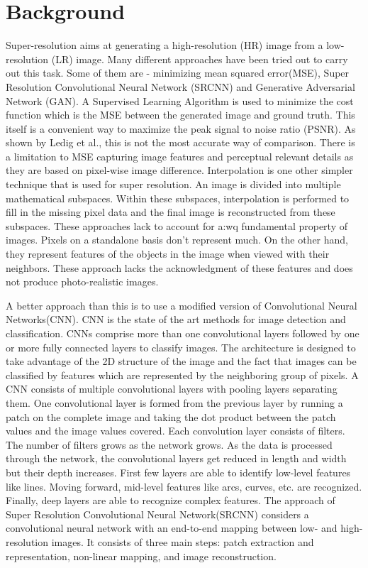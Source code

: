 \section{Background}

Super-resolution aims at generating a high-resolution (HR) image from a
low-resolution (LR) image. Many different approaches have been tried out to
carry out this task. Some of them are - minimizing mean squared error(MSE),
Super Resolution Convolutional Neural Network (SRCNN) and Generative Adversarial
Network (GAN). A Supervised Learning Algorithm is used to minimize the cost
function which is the MSE between the generated image and ground truth. This
itself is a convenient way to maximize the peak signal to noise ratio (PSNR).
As shown by Ledig et al.\cite{Ledig}, this is not the most accurate way of comparison.
There is a limitation to MSE capturing image features and perceptual relevant
details as they are based on pixel-wise image difference. Interpolation is one
other simpler technique that is used for super resolution\cite{Siu}. An image is
divided into multiple mathematical subspaces. Within these subspaces,
interpolation is performed to fill in the missing pixel data and the final image
is reconstructed from these subspaces. These approaches lack to account for a:wq
fundamental property of images. Pixels on a standalone basis don’t represent
much. On the other hand, they represent features of the objects in the image
when viewed with their neighbors. These approach lacks the acknowledgment of
these features and does not produce photo-realistic images\cite{Ferwerda}.

A better approach than this is to use a modified version of Convolutional Neural
Networks(CNN). CNN is the state of the art methods for image detection and
classification\cite{Krizhevsky, Jaswal2014}. CNNs comprise more than one convolutional layers followed
by one or more fully connected layers to classify images. The architecture is
designed to take advantage of the 2D structure of the image and the fact that
images can be classified by features which are represented by the neighboring
group of pixels. A CNN consists of multiple convolutional layers with pooling
layers separating them. One convolutional layer is formed from the previous
layer by running a patch on the complete image and taking the dot product
between the patch values and the image values covered. Each convolution layer
consists of filters. The number of filters grows as the network grows. As the
data is processed through the network, the convolutional layers get reduced in
length and width but their depth increases. First few layers are able to
identify low-level features like lines. Moving forward, mid-level features like
arcs, curves, etc. are recognized. Finally, deep layers are able to recognize
complex features. The approach of Super Resolution Convolutional Neural
Network(SRCNN)\cite{Long} considers a convolutional neural network with an end-to-end
mapping between low- and high-resolution images. It consists of three main
steps: patch extraction and representation, non-linear mapping, and image
reconstruction\cite{Long}.

